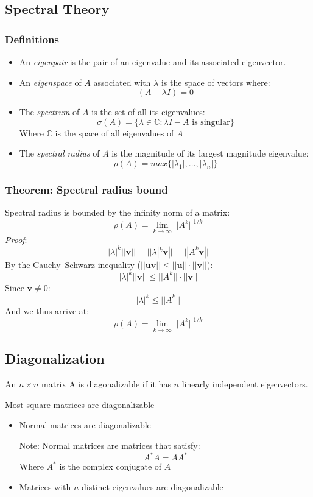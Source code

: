 \documentclass{article}
\begin{document}
\subsection{Spectral Theory}
\subsubsection{Definitions}
\begin{itemize}
\item An \textit{eigenpair} is the pair of an eigenvalue and its associated eigenvector.
\item An \textit{eigenspace} of $A$ associated with $\lambda$ is the space of vectors where:
$$(A-\lambda I) = 0$$
\item The \textit{spectrum} of $A$ is the set of all its eigenvalues:
$$\sigma(A)=\lbrace\lambda \in \mathbb{C}: \lambda I - A \textrm{ is singular}\rbrace$$
Where $\mathbb{C}$ is the space of all eigenvalues of $A$
\item The \textit{spectral radius} of $A$ is the magnitude of its largest magnitude eigenvalue:
$$\rho(A)=max\lbrace |\lambda_1|, \ldots, |\lambda_n| \rbrace$$

\end{itemize}
\subsubsection{Theorem: Spectral radius bound} Spectral radius is bounded by the infinity norm of a matrix:
$$\rho(A)=\lim_{k\to\infty} ||A^k||^{1/k}$$
\textit{Proof}:
$$|\lambda|^k||\mathbf{v}||=||\lambda|^k\mathbf{v}||=||A^k\mathbf{v}||$$
By the Cauchy–Schwarz inequality ($||\mathbf{u}\mathbf{v}|| \leq ||\mathbf{u}||\cdot||\mathbf{v}||$):
$$|\lambda|^k||\mathbf{v}|| \leq ||A^k||\cdot||\mathbf{v}||$$
Since $\mathbf{v} \neq 0$:
$$|\lambda|^k \leq ||A^k||$$
And we thus arrive at:
$$\rho(A)=\lim_{k\to\infty} ||A^k||^{1/k}$$

\subsection{Diagonalization}
An $n\times n$ matrix A is diagonalizable if it has $n$ linearly independent eigenvectors.

Most square matrices are diagonalizable
\begin{itemize}
\item Normal matrices are diagonalizable

Note: Normal matrices are matrices that satisfy:
$$A^* A=AA^*$$
Where $A^*$ is the complex conjugate of $A$
\item Matrices with $n$ distinct eigenvalues are diagonalizable
\end{itemize}
\end{document}

